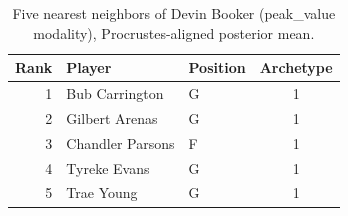 \begin{table}[htbp]
  \centering\small
  \begin{tabular}{rllc}
    \toprule
    Rank & Player & Position & Archetype \\
    \midrule
    1 & Bub Carrington & G & 1 \\
    2 & Gilbert Arenas & G & 1 \\
    3 & Chandler Parsons & F & 1 \\
    4 & Tyreke Evans & G & 1 \\
    5 & Trae Young & G & 1 \\
    \bottomrule
  \end{tabular}
  \caption{Five nearest neighbors of Devin Booker (peak_value modality), Procrustes-aligned posterior mean.}
  \label{tab:Devin_Booker_neighbors_peak_value}
\end{table}

